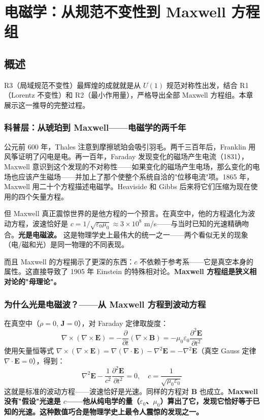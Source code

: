 \chapter{电磁学：从规范不变性到 Maxwell 方程组}
\label{ch:electromagnetism}

\section{概述}

R3（局域规范不变性）最辉煌的成就就是从 $U(1)$ 规范对称性出发，结合 R1（Lorentz 不变性）和 R2（最小作用量），严格导出全部 Maxwell 方程组。本章展示这一推导的完整过程。

\subsection{科普层：从琥珀到 Maxwell——电磁学的两千年}

公元前 600 年，Thales 注意到摩擦琥珀会吸引羽毛。两千三百年后，Franklin 用风筝证明了闪电是电。再一百年，Faraday 发现变化的磁场产生电流（1831），Maxwell 意识到这个发现的不对称性——如果变化的磁场产生电场，那么变化的电场也应该产生磁场——并加上了那个使整个系统自洽的"位移电流"项。1865 年，Maxwell 用二十个方程描述电磁学。Heaviside 和 Gibbs 后来将它们压缩为现在使用的四个矢量方程。

但 Maxwell 真正震惊世界的是他方程的一个预言。在真空中，他的方程退化为波动方程，波速恰好是 $c = 1/\sqrt{\varepsilon_0\mu_0} \approx 3\times 10^8$ m/s——与当时已知的光速精确吻合。\textbf{光是电磁波。} 这是物理学史上最伟大的统一之一——两个看似无关的现象（电/磁和光）是同一物理的不同表现。

而且 Maxwell 的方程揭示了更深的东西：$c$ 不依赖于参考系——它是真空本身的属性。这直接导致了 1905 年 Einstein 的特殊相对论。\textbf{Maxwell 方程组是狭义相对论的"母理论"。}

\subsection{为什么光是电磁波？——从 Maxwell 方程到波动方程}

在真空中（$\rho=0$, $\mathbf{J}=0$），对 Faraday 定律取旋度：
\[
\nabla\times(\nabla\times\mathbf{E}) = -\frac{\partial}{\partial t}(\nabla\times\mathbf{B}) = -\mu_0\varepsilon_0\frac{\partial^2\mathbf{E}}{\partial t^2}
\]
使用矢量恒等式 $\nabla\times(\nabla\times\mathbf{E}) = \nabla(\nabla\cdot\mathbf{E}) - \nabla^2\mathbf{E} = -\nabla^2\mathbf{E}$（真空 Gauss 定律 $\nabla\cdot\mathbf{E}=0$），得到：
\[
\boxed{\nabla^2\mathbf{E} - \frac{1}{c^2}\frac{\partial^2\mathbf{E}}{\partial t^2} = 0, \quad c = \frac{1}{\sqrt{\mu_0\varepsilon_0}}}
\]
这就是标准的波动方程——波速恰好是光速。同样的方程对 $\mathbf{B}$ 也成立。\textbf{Maxwell 没有"假设"光速是 $c$——他从纯电学的量（$\varepsilon_0$、$\mu_0$）算出了它，发现它恰好等于已知的光速。这种数值巧合是物理学史上最令人震惊的发现之一。}

